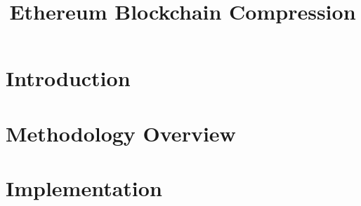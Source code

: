 \documentclass[10pt,numbers]{sigplanconf}
\theoremstyle{definition}
\begin{document}
\allowdisplaybreaks[1]





\title{Ethereum Blockchain Compression}
\maketitle
\begin{abstract}

\end{abstract}



\section{Introduction} \label{sec:intro}

%

\section{Methodology Overview}\label{sec:overview}


\section{Implementation}\label{sec:implement}

\end{document}
